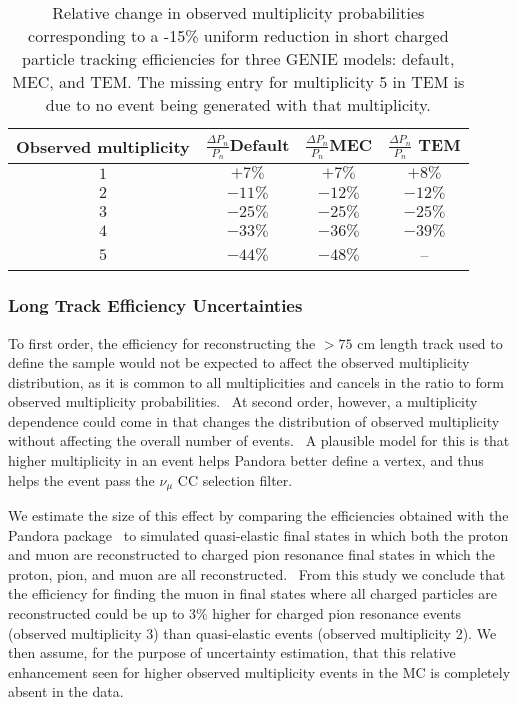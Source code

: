 \documentclass{article}
\begin{document}
\begin{table}[tbp]
\caption{
Relative change in observed multiplicity probabilities corresponding to a -15\% uniform reduction in short charged particle tracking efficiencies for three GENIE models:  default, MEC, and TEM.
The missing entry for multiplicity 5 in TEM is due to no event being generated with that multiplicity.}\label{Short track efficiency}%
\centering%
\begin{tabular}{c|c|c|c}

\textbf{Observed multiplicity} & $\frac{\Delta P_{n}}{P_{n}}$\textbf{Default}
& $\frac{\Delta P_{n}}{P_{n}}$\textbf{MEC} & $\frac{\Delta P_{n}}{P_{n}}$%
\textbf{TEM} \\ \hline
$1$ & $+7\%$ & $+7\%$ & $+8\%$ \\ 
$2$ & $-11\%$ & $-12\%$ & $-12\%$ \\ 
$3$ & $-25\%$ & $-25\%$ & $-25\%$ \\ 
$4$ & $-33\%$ & $-36\%$ & $-39\%$ \\ 
$5$ & $-44\%$ & $-48\%$ &  --\\ 
\end{tabular}%

\end{table}%

\subsubsection{Long Track Efficiency Uncertainties}

To first order, the efficiency for reconstructing the $>75$ cm length track
used to define the sample would not be expected to affect the observed
multiplicity distribution, as it is common to all multiplicities and cancels
in the ratio to form observed multiplicity probabilities. \ At second order,
however, a multiplicity dependence could come in that changes the
distribution of observed multiplicity without affecting the overall number
of events. \ A plausible model for this is that higher multiplicity in an
event helps Pandora better define a vertex, and thus helps the event pass
the $\nu _{\mu }$ CC selection filter.

We estimate the size of this effect by comparing the efficiencies obtained
with the Pandora package~\cite{DocDB5987-Pandora-PUB} to simulated
quasi-elastic final states in which both the proton and muon are
reconstructed to charged pion resonance final states in which the proton,
pion, and muon are all reconstructed. \ From this study we conclude that the
efficiency for finding the muon in final states where all charged particles
are reconstructed could be up to $3\%$ higher for charged pion resonance
events (observed multiplicity 3) than quasi-elastic events (observed
multiplicity 2). We then assume, for the purpose of uncertainty estimation,
that this relative enhancement seen for higher observed multiplicity events
in the MC is completely absent in the data.
\end{document}
